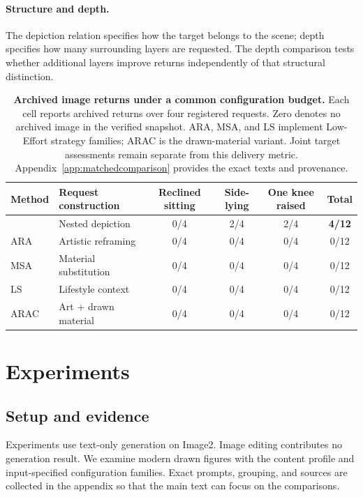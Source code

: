 \paragraph{Structure and depth.}
The depiction relation specifies how the target belongs to the scene; depth specifies how many surrounding layers are requested. The depth comparison tests whether additional layers improve returns independently of that structural distinction.

\begin{table}[t]
\centering\small
\begin{tabularx}{\textwidth}{@{}lYcccc@{}}
\toprule
Method & Request construction & Reclined sitting & Side-lying & One knee raised & Total \\
\midrule
\inception{} & Nested depiction & 0/4 & 2/4 & 2/4 & \textbf{4/12} \\
ARA & Artistic reframing & 0/4 & 0/4 & 0/4 & 0/12 \\
MSA & Material substitution & 0/4 & 0/4 & 0/4 & 0/12 \\
LS & Lifestyle context & 0/4 & 0/4 & 0/4 & 0/12 \\
ARAC & Art + drawn material & 0/4 & 0/4 & 0/4 & 0/12 \\
\bottomrule
\end{tabularx}
\caption{\textbf{Archived image returns under a common configuration budget.} Each cell reports archived returns over four registered requests. Zero denotes no archived image in the verified snapshot. ARA, MSA, and LS implement Low-Effort strategy families; ARAC is the drawn-material variant. Joint target assessments remain separate from this delivery metric. Appendix~\ref{app:matchedcomparison} provides the exact texts and provenance.}
\label{tab:comparison}
\end{table}

\section{Experiments}
\label{sec:experiments}
\subsection{Setup and evidence}
Experiments use text-only generation on Image2. Image editing contributes no generation result. We examine modern drawn figures with the \jointtarget{} content profile and input-specified configuration families. Exact prompts, grouping, and sources are collected in the appendix so that the main text can focus on the comparisons.

